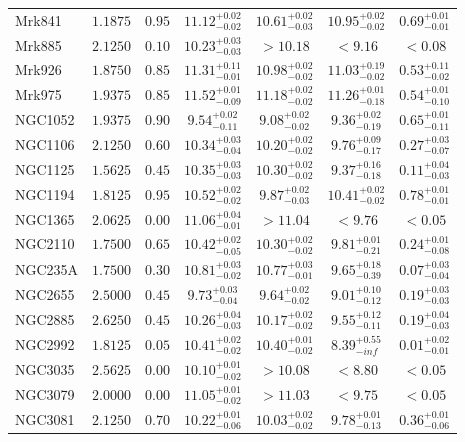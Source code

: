 \documentclass[onecolumn]{mn2e}
\begin{document}
{\begin{center}
\begin{longtable}{lcccccc}
Mrk841 & $1.1875$ & $0.95$ & $11.12_{-0.02}^{+0.02}$ & $10.61_{-0.03}^{+0.02}$ & $10.95_{-0.02}^{+0.02}$ &$0.69_{-0.01}^{+0.01}$ \\
Mrk885 & $2.1250$ & $0.10$ & $10.23_{-0.03}^{+0.03}$ & $>10.18$ & $<9.16$ &$<0.08$ \\
Mrk926 & $1.8750$ & $0.85$ & $11.31_{-0.01}^{+0.11}$ & $10.98_{-0.02}^{+0.02}$ & $11.03_{-0.02}^{+0.19}$ &$0.53_{-0.02}^{+0.11}$ \\
Mrk975 & $1.9375$ & $0.85$ & $11.52_{-0.09}^{+0.01}$ & $11.18_{-0.02}^{+0.02}$ & $11.26_{-0.18}^{+0.01}$ &$0.54_{-0.10}^{+0.01}$ \\
NGC1052 & $1.9375$ & $0.90$ & $9.54_{-0.11}^{+0.02}$ & $9.08_{-0.02}^{+0.02}$ & $9.36_{-0.19}^{+0.02}$ &$0.65_{-0.11}^{+0.01}$ \\
NGC1106 & $2.1250$ & $0.60$ & $10.34_{-0.04}^{+0.03}$ & $10.20_{-0.02}^{+0.02}$ & $9.76_{-0.17}^{+0.09}$ &$0.27_{-0.07}^{+0.03}$ \\
NGC1125 & $1.5625$ & $0.45$ & $10.35_{-0.03}^{+0.03}$ & $10.30_{-0.02}^{+0.02}$ & $9.37_{-0.18}^{+0.16}$ &$0.11_{-0.03}^{+0.04}$ \\
NGC1194 & $1.8125$ & $0.95$ & $10.52_{-0.02}^{+0.02}$ & $9.87_{-0.03}^{+0.02}$ & $10.41_{-0.02}^{+0.02}$ &$0.78_{-0.01}^{+0.01}$ \\
NGC1365 & $2.0625$ & $0.00$ & $11.06_{-0.01}^{+0.04}$ & $>11.04$ & $<9.76$ &$<0.05$ \\
NGC2110 & $1.7500$ & $0.65$ & $10.42_{-0.05}^{+0.02}$ & $10.30_{-0.02}^{+0.02}$ & $9.81_{-0.21}^{+0.01}$ &$0.24_{-0.08}^{+0.01}$ \\
NGC235A & $1.7500$ & $0.30$ & $10.81_{-0.02}^{+0.03}$ & $10.77_{-0.01}^{+0.03}$ & $9.65_{-0.39}^{+0.18}$ &$0.07_{-0.04}^{+0.03}$ \\
NGC2655 & $2.5000$ & $0.45$ & $9.73_{-0.04}^{+0.03}$ & $9.64_{-0.02}^{+0.02}$ & $9.01_{-0.12}^{+0.10}$ &$0.19_{-0.03}^{+0.03}$ \\
NGC2885 & $2.6250$ & $0.45$ & $10.26_{-0.03}^{+0.04}$ & $10.17_{-0.02}^{+0.02}$ & $9.55_{-0.11}^{+0.12}$ &$0.19_{-0.03}^{+0.04}$ \\
NGC2992 & $1.8125$ & $0.05$ & $10.41_{-0.02}^{+0.02}$ & $10.40_{-0.02}^{+0.01}$ & $8.39_{-inf}^{+0.55}$ &$0.01_{-0.01}^{+0.02}$ \\
NGC3035 & $2.5625$ & $0.00$ & $10.10_{-0.02}^{+0.01}$ & $>10.08$ & $<8.80$ &$<0.05$ \\
NGC3079 & $2.0000$ & $0.00$ & $11.05_{-0.02}^{+0.01}$ & $>11.03$ & $<9.75$ &$<0.05$ \\
NGC3081 & $2.1250$ & $0.70$ & $10.22_{-0.06}^{+0.01}$ & $10.03_{-0.02}^{+0.02}$ & $9.78_{-0.13}^{+0.01}$ &$0.36_{-0.06}^{+0.01}$ \\

\end{longtable}
\end{center}}
\end{document}
